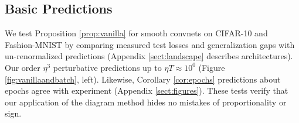 \documentclass{article}
\theoremstyle{plain}
\theoremstyle{definition}
\begin{document}

    \subsection{Basic Predictions}
        We test Proposition \ref{prop:vanilla} for smooth convnets on CIFAR-10
        and Fashion-MNIST by comparing measured test losses and generalization
        gaps with un-renormalized predictions (Appendix \ref{sect:landscape}
        describes architectures).  Our order $\eta^3$ perturbative predictions
        up to $\eta T \approx 10^0$ (Figure \ref{fig:vanillaandbatch}, left).
        Likewise, Corollary \ref{cor:epochs} predictions about epochs agree
        with experiment (Appendix \ref{sect:figures}).  These tests verify that
        our application of the diagram method hides no mistakes of
        proportionality or sign.  

 
   
\end{document}
